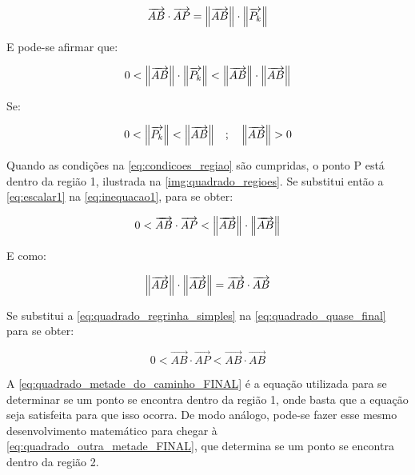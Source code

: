 \begin{alineas}[leftmargin=0pt, itemindent=20pt, labelwidth=15pt, labelsep=5pt, listparindent=1.25cm, align=left]
    \begin{equation}
        \label{eq:escalar1}
        \overrightarrow{AB} \cdot \overrightarrow{AP} = \norm{\overrightarrow{AB}} \cdot \norm{\overrightarrow{P_k}}
    \end{equation}
    
    E pode-se afirmar que:
    
    \begin{equation}
        \label{eq:inequacao1}
        0 < \norm{\overrightarrow{AB}} \cdot \norm{\overrightarrow{P_k}} < \norm{\overrightarrow{AB}} \cdot \norm{\overrightarrow{AB}}
    \end{equation}
    
    Se:
    
    \begin{equation}
        \label{eq:condicoes_regiao}
        0 < \norm{\overrightarrow{P_k}} < \norm{\overrightarrow{AB}} \quad ; \quad \norm{\overrightarrow{AB}} > 0
    \end{equation}
    
    Quando as condições na \autoref{eq:condicoes_regiao} são cumpridas, o ponto P está dentro da região 1, ilustrada na \autoref{img:quadrado_regioes}. Se substitui então a \autoref{eq:escalar1} na \autoref{eq:inequacao1}, para se obter:
    
    \begin{equation}
        \label{eq:quadrado_quase_final}
        0 < \overrightarrow{AB} \cdot \overrightarrow{AP} < \norm{\overrightarrow{AB}} \cdot \norm{\overrightarrow{AB}}
    \end{equation}
    
    E como: 
    
    \begin{equation}
        \label{eq:quadrado_regrinha_simples}
        \norm{\overrightarrow{AB}} \cdot \norm{\overrightarrow{AB}} = \overrightarrow{AB} \cdot \overrightarrow{AB}
    \end{equation}
    
    Se substitui a \autoref{eq:quadrado_regrinha_simples} na \autoref{eq:quadrado_quase_final} para se obter:
    
    \begin{equation}
        \label{eq:quadrado_metade_do_caminho_FINAL}
        0 < \overrightarrow{AB} \cdot \overrightarrow{AP} < \overrightarrow{AB} \cdot \overrightarrow{AB}
    \end{equation}
    
    A \autoref{eq:quadrado_metade_do_caminho_FINAL} é a equação utilizada para se determinar se um ponto se encontra dentro da região 1, onde basta que a equação seja satisfeita para que isso ocorra. De modo análogo, pode-se fazer esse mesmo desenvolvimento matemático para chegar à \autoref{eq:quadrado_outra_metade_FINAL}, que determina se um ponto se encontra dentro da região 2.
    

\end{alineas}
